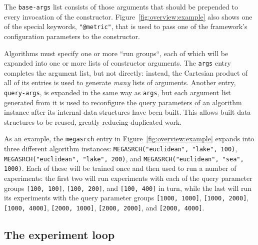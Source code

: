 The \texttt{base-args} list consists of those arguments that should be
prepended to every invocation of the constructor. Figure~\ref{fig:overview:example}
also shows one of the special keywords, \texttt{"@metric"}, that is used to
pass one of the framework's configuration parameters to the constructor.

Algorithms must specify one or more ``run groups``, each of which will be
expanded into one or more lists of constructor arguments. The \texttt{args}
entry completes the argument list, but not directly:
instead, the Cartesian product of all of its entries is used to generate
\emph{many} lists of arguments. 
Another entry, \texttt{query-args}, is expanded in the same way as \texttt{args},
but each argument list generated from it is used to reconfigure the query
parameters of an algorithm instance after its internal data structures have
been built. This allows built data structures to be reused, greatly reducing
duplicated work.

As an example,
the \texttt{megasrch} entry in 
Figure~\ref{fig:overview:example} expands into
three different algorithm instances: \texttt{MEGASRCH("euclidean", "lake", 100)},
\texttt{MEGASRCH("euclidean", "lake", 200)}, and \texttt{MEGASRCH("euclidean", "sea", 1000)}. Each of
these will be trained once and then used to run a number of experiments: the
first two will run experiments with each of the query parameter groups \texttt{[100, 100]},
\texttt{[100, 200]}, and \texttt{[100, 400]} in turn, while the last will run
its experiments with the query parameter groups
\texttt{[1000, 1000]}, \texttt{[1000, 2000]}, \texttt{[1000, 4000]},
\texttt{[2000, 1000]}, \texttt{[2000, 2000]}, and \texttt{[2000, 4000]}.




\subsection{The experiment loop}

